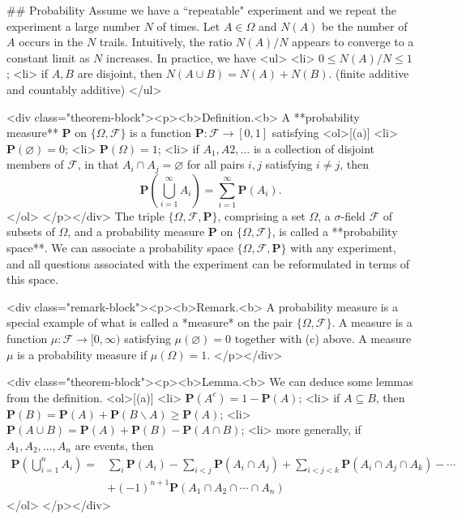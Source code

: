 ## Probability
Assume we have a ``repeatable" experiment and we repeat the experiment a large number $N$ of times. Let $A \in \Omega$ and $N(A)$ be the number of $A$ occurs in the $N$ trails. Intuitively, the ratio $N(A)/ N$ appears to converge to a constant limit as $N$ increases. In practice, we have 
<ul>
    <li> $0 \leq N(A)/ N \leq 1$;
    <li> if $A, B$ are disjoint, then $N(A \cup B) = N(A) + N(B)$. (finite additive and countably additive)
</ul>

<div class="theorem-block"><p><b>Definition.<b> 
A **probability measure** $\mathbf{P}$ on $\{ \Omega, \mathcal{F} \}$ is a function $\mathbf{P} : \mathcal{F} \to [0,1]$ satisfying
<ol>[(a)]
    <li> $\mathbf{P}(\varnothing) = 0$;
    <li> $\mathbf{P}(\Omega) = 1$;
    <li>  if $A_1, A2, \dots$ is a collection of disjoint members of $\mathcal{F}$, in that $A_i \cap A_j = \varnothing$ for all pairs $i, j$ satisfying $i \neq j$, then
    $$\begin{equation}
        \mathbf{P}\left( \bigcup_{i=1}^\infty A_i \right) = \sum_{i=1}^\infty \mathbf{P} (A_i).
    \end{equation}$$
</ol>
</p></div>
The triple $\{ \Omega, \mathcal{F}, \mathbf{P} \}$, comprising a set $\Omega$, a $\sigma$-field $\mathcal{F}$ of subsets of $\Omega$, and a probability measure $\mathbf{P}$ on $\{\Omega, \mathcal{F}\}$, is called a **probability space**. We can associate a probability space $\{ \Omega, \mathcal{F}, \mathbf{P} \}$ with any experiment, and all questions associated with the experiment can be reformulated in terms of this space. 

<div class="remark-block"><p><b>Remark.<b> 
A probability measure is a special example of what is called a *measure* on the pair $\{\Omega, \mathcal{F}\}$. A measure is a function $\mu: \mathcal{F} \to [0, \infty)$ satisfying $\mu(\varnothing) = 0$ together with (c) above. A measure $\mu$ is a probability measure if $\mu(\Omega) = 1$. 
</p></div>

<div class="theorem-block"><p><b>Lemma.<b> 
We can deduce some lemmas from the definition.
<ol>[(a)]
    <li> $\mathbf{P}(A^c) = 1 - \mathbf{P}(A)$;
    <li> if $A \subseteq B$, then $\mathbf{P}(B) = \mathbf{P}(A) + \mathbf{P}(B\backslash A) \geq \mathbf{P}(A)$;
    <li> $\mathbf{P}(A \cup B) = \mathbf{P}(A) + \mathbf{P}(B) - \mathbf{P}(A \cap B)$;
    <li> more generally, if $A_1, A_2, \dots, A_n$ are events, then 
    $$\begin{equation}
        \begin{split}
        \mathbf{P}\left( \bigcup_{i=1}^n A_i \right) =& \sum_{i}\mathbf{P}(A_i) - \sum_{i < j} \mathbf{P}(A_i \cap A_j) + \sum_{i<j<k} \mathbf{P}(A_i \cap A_j \cap A_k) - \cdots \\
        & +(-1)^{n+1} \mathbf{P}(A_1 \cap A_2 \cap \cdots \cap A_n)
        \end{split}
    \end{equation}$$
</ol>
</p></div>

